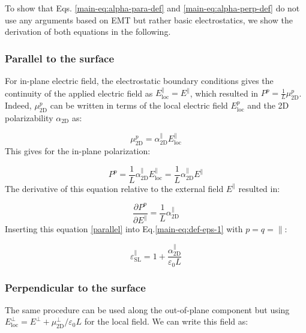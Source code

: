 \documentclass[journal=ancac3,email=true,hyperref=true,keywords=false]{achemso}
\begin{document}
To show that Eqs. \ref{main-eq:alpha-para-def} and \ref{main-eq:alpha-perp-def} do not use any arguments based on EMT but rather basic electrostatics, we show the derivation of both equations in the following. 

\subsubsection{Parallel to the surface}

For in-plane electric field, the electrostatic boundary conditions gives the continuity of the applied electric field as  
${E}^{\parallel}_{\mathrm{loc}}={E}^{\parallel}$\cite{Markel_2016}, which resulted in 
${P}^{p}=\frac{1}{L} {\mu}^{p}_{\mathrm{2D}}$. Indeed, ${\mu}^{p}_{\mathrm{2D}}$ can be written in terms of the local electric field ${E}_{\mathrm{loc}}^{p}$ and the 2D polarizability $\alpha_{\mathrm{2D}}$ as:

\begin{equation}
{\mu}^{p}_{\mathrm{2D}} = \alpha^{\parallel}_{\mathrm{2D}} {E}^{\parallel}_{\mathrm{loc}} 
\end{equation}
%
This gives for the in-plane polarization:  

\begin{equation}
{P}^{p}=\frac{1}{L} \alpha^{\parallel}_{\mathrm{2D}} {E}^{\parallel}_{\mathrm{loc}} = \frac{1}{L} \alpha^{\parallel}_{\mathrm{2D}} {E}^{\parallel} 
\end{equation}
%
The derivative of this equation relative to the external field ${E}^{\parallel}$ resulted in:  

\begin{equation}
\frac{\partial {P}^{p}}{\partial {E}^{\parallel}} =\frac{1}{L} \alpha^{\parallel}_{\mathrm{2D}} 
\label{parallel}
\end{equation}
%
Inserting this equation \ref{parallel} into Eq.\ref{main-eq:def-eps-1} with $p=q=\parallel$: 

\begin{equation}
\varepsilon_{\mathrm{SL}}^{\parallel} =  1 + \frac{\alpha_{\mathrm{2D}}^{\parallel}}{\varepsilon_0 L}
\end{equation}

\subsubsection{Perpendicular to the surface}

The same procedure can be used along the out-of-plane component but using ${E}_{\mathrm{loc}}^{\perp}={E}^{\perp}+{\mu}_{\mathrm{2D}}^{\perp}/\varepsilon_0 L$ for the local field. We can write this field as: 
\end{document}
